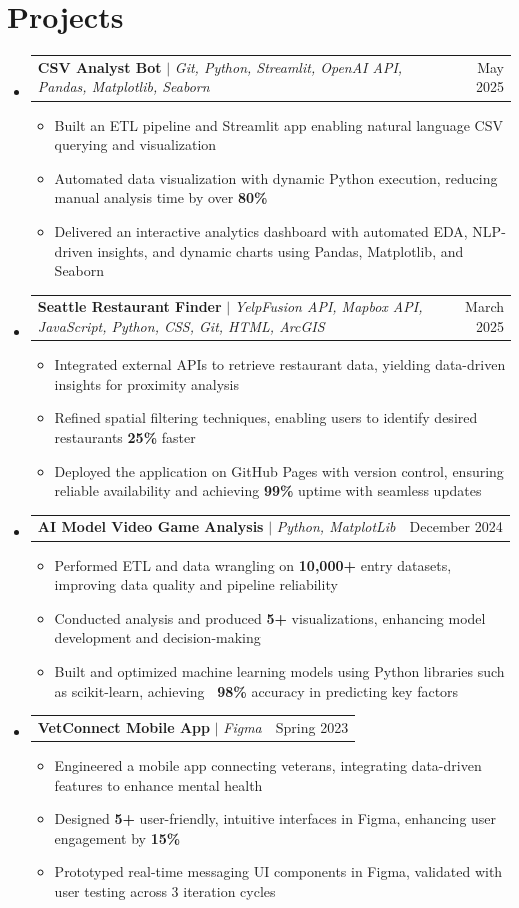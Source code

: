 \documentclass[letterpaper,11pt]{article}
\makeatletter
\newcommand{\resumeItem}[1]{
  \item\small{
    {#1 \vspace{-2pt}}
  }
}
\newcommand{\resumeProjectHeading}[2]{
    \item
    \begin{tabular*}{0.97\textwidth}{l@{\extracolsep{\fill}}r}
      \small#1 & #2 \\
    \end{tabular*}\vspace{-7pt}
}
\newcommand{\resumeSubHeadingListStart}{\begin{itemize}[leftmargin=0.15in, label={}]}
\newcommand{\resumeSubHeadingListEnd}{\end{itemize}}
\newcommand{\resumeItemListStart}{\begin{itemize}}
\newcommand{\resumeItemListEnd}{\end{itemize}\vspace{-5pt}}
\makeatother
\begin{document}
\section{Projects}
    \resumeSubHeadingListStart
    \resumeProjectHeading
          {\textbf{CSV Analyst Bot} $|$ \emph{Git, Python, Streamlit, OpenAI API, Pandas, Matplotlib, Seaborn}}{May 2025}
          \resumeItemListStart
            \resumeItem{Built an ETL pipeline and Streamlit app enabling natural language CSV querying and visualization}
            \resumeItem{Automated data visualization with dynamic Python execution, reducing manual analysis time by over \textbf{80\%}}
            \resumeItem{Delivered an interactive analytics dashboard with automated EDA, NLP-driven insights, and dynamic charts using Pandas, Matplotlib, and Seaborn}
          \resumeItemListEnd
    \resumeProjectHeading
          {\textbf{Seattle Restaurant Finder} $|$ \emph{YelpFusion API, Mapbox API, JavaScript, Python, CSS, Git, HTML, ArcGIS}}{March 2025}
          \resumeItemListStart
            \resumeItem{Integrated external APIs to retrieve restaurant data, yielding data-driven insights for proximity analysis}
            \resumeItem{Refined spatial filtering techniques, enabling users to identify desired restaurants \textbf{25\%} faster}
            \resumeItem{Deployed the application on GitHub Pages with version control, ensuring reliable availability and achieving \textbf{99\%} uptime with seamless updates}
          \resumeItemListEnd
        \resumeProjectHeading
          {\textbf{AI Model Video Game Analysis} $|$ \emph{Python, MatplotLib}}{December 2024}
          \resumeItemListStart
            \resumeItem{Performed ETL and data wrangling on \textbf{10,000+} entry datasets, improving data quality and pipeline reliability}
            \resumeItem{Conducted analysis and produced \textbf{5+} visualizations, enhancing model development and decision-making}
            \resumeItem{Built and optimized machine learning models using Python libraries such as scikit-learn, achieving \textbf{~98\%} accuracy in predicting key factors}
          \resumeItemListEnd
      \resumeProjectHeading
          {\textbf{VetConnect Mobile App} $|$ \emph{Figma}}{Spring 2023}
          \resumeItemListStart
            \resumeItem{Engineered a mobile app connecting veterans, integrating data-driven features to enhance mental health}
            \resumeItem{Designed \textbf{5+} user-friendly, intuitive interfaces in Figma, enhancing user engagement by \textbf{15\%}}
            \resumeItem{Prototyped real-time messaging UI components in Figma, validated with user testing across 3 iteration cycles}
          \resumeItemListEnd
    \resumeSubHeadingListEnd
\end{document}
